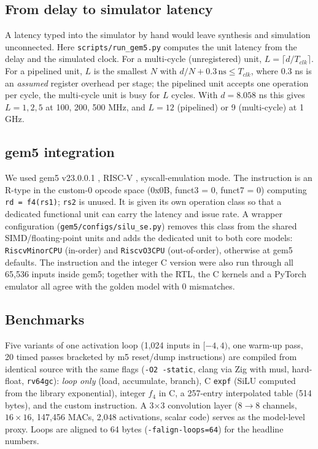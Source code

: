 \documentclass[conference]{IEEEtran}
\begin{document}
\subsection{From delay to simulator latency}
A latency typed into the simulator by hand would leave synthesis and simulation unconnected. Here \texttt{scripts/run\_gem5.py} computes the unit latency from the delay and the simulated clock. For a multi-cycle (unregistered) unit, $L=\lceil d/T_{clk}\rceil$. For a pipelined unit, $L$ is the smallest $N$ with $d/N+0.3\,\mathrm{ns}\le T_{clk}$, where 0.3 ns is an \emph{assumed} register overhead per stage; the pipelined unit accepts one operation per cycle, the multi-cycle unit is busy for $L$ cycles. With $d=8.058$ ns this gives $L=1,2,5$ at 100, 200, 500 MHz, and $L=12$ (pipelined) or 9 (multi-cycle) at 1 GHz.

\subsection{gem5 integration}
We used gem5 v23.0.0.1 \cite{binkert2011,lowepower2020}, RISC-V \cite{riscv}, syscall-emulation mode. The instruction is an R-type in the custom-0 opcode space (0x0B, funct3 = 0, funct7 = 0) computing \texttt{rd = f4(rs1)}; \texttt{rs2} is unused. It is given its own operation class so that a dedicated functional unit can carry the latency and issue rate. A wrapper configuration (\texttt{gem5/configs/silu\_se.py}) removes this class from the shared SIMD/floating-point units and adds the dedicated unit to both core models: \texttt{RiscvMinorCPU} (in-order) and \texttt{RiscvO3CPU} (out-of-order), otherwise at gem5 defaults. The instruction and the integer C version were also run through all 65,536 inputs inside gem5; together with the RTL, the C kernels and a PyTorch emulator all agree with the golden model with 0 mismatches.

\subsection{Benchmarks}
Five variants of one activation loop (1,024 inputs in $[-4,4)$, one warm-up pass, 20 timed passes bracketed by m5 reset/dump instructions) are compiled from identical source with the same flags (\texttt{-O2 -static}, clang via Zig with musl, hard-float, \texttt{rv64gc}): \emph{loop only} (load, accumulate, branch), C \texttt{expf} (SiLU computed from the library exponential), integer $f_4$ in C, a 257-entry interpolated table (514 bytes), and the custom instruction. A 3$\times$3 convolution layer (8$\to$8 channels, $16\times16$, 147,456 MACs, 2,048 activations, scalar code) serves as the model-level proxy. Loops are aligned to 64 bytes (\texttt{-falign-loops=64}) for the headline numbers.
\end{document}
